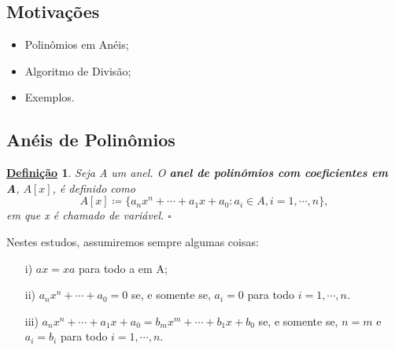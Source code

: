 \documentclass{article}
\newtheorem*{def*}{\underline{Defini\c c\~ao}}
\begin{document}
    \subsection{Motivações}
    \begin{itemize}
      \item Polinômios em Anéis;
      \item Algoritmo de Divisão;
      \item Exemplos.
    \end{itemize}
    \subsection{Anéis de Polinômios}
    \begin{def*}
      Seja A um anel. O \textbf{anel de polinômios com coeficientes em A}, \(A[x]\), é definido como 
      \[
        A[x]\coloneqq \{a_{n}x^{n}+\cdots+a_{1}x + a_{0}: a_{i}\in A, i = 1, \cdots, n\},
      \]
      em que x é chamado de variável. \(\square\)
    \end{def*}
    Nestes estudos, assumiremos sempre algumas coisas:
    \begin{itemize}
      \item[i)] \(ax = xa\) para todo a em A;
      \item[ii)] \(a_{n}x^{n} + \cdots + a_{0} = 0\) se, e somente se, \(a_{i} = 0\) para todo \(i=1, \cdots, n.\)
      \item[iii)] \(a_{n}x^{n} + \cdots + a_{1}x + a_{0} = b_{m}x^{m} + \cdots + b_{1}x + b_{0}\) se, e somente se, \(n=m\) e \(a_{i} = b_{i}\) para todo \(i=1, \cdots, n\).
    \end{itemize}
\end{document}
